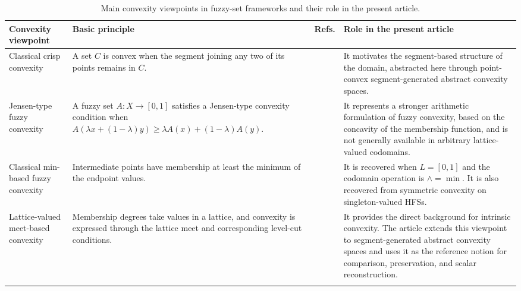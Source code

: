 \documentclass[11pt,a4paper]{article}
\begin{document}
\begin{table}[htbp]
\centering
\scriptsize
\setlength{\tabcolsep}{3pt}
\renewcommand{\arraystretch}{1.18}
\caption{Main convexity viewpoints in fuzzy-set frameworks and their role in the present article.}
\label{tablageneral}
\begin{tabularx}{\textwidth}{@{}
L{0.17\textwidth}
L{0.29\textwidth}
C{0.15\textwidth}
X
@{}}
\toprule
\textbf{Convexity viewpoint} &
\textbf{Basic principle} &
\textbf{Refs.} &
\textbf{Role in the present article} \\
\midrule

Classical crisp convexity &
A set \(C\) is convex when the segment joining any two of its points remains in \(C\). &
\citep{Klee1971} &
It motivates the segment-based structure of the domain, abstracted here through point-convex segment-generated abstract convexity spaces. \\

\addlinespace

Jensen-type fuzzy convexity &
A fuzzy set \(A:X\to[0,1]\) satisfies a Jensen-type convexity condition when
\(A(\lambda x+(1-\lambda)y)\geq \lambda A(x)+(1-\lambda)A(y)\). &
\citep{AmmarMetz1992,SyauLee2003} &
It represents a stronger arithmetic formulation of fuzzy convexity, based on the concavity of the membership function, and is not generally available in arbitrary lattice-valued codomains. \\

\addlinespace

Classical min-based fuzzy convexity &
Intermediate points have membership at least the minimum of the endpoint values. &
\citep{Zadeh1965,Lowen1980} &
It is recovered when \(L=[0,1]\) and the codomain operation is \(\wedge=\min\). It is also recovered from symmetric convexity on singleton-valued HFSs. \\

\addlinespace

Lattice-valued meet-based convexity &
Membership degrees take values in a lattice, and convexity is expressed through the lattice meet and corresponding level-cut conditions. &
\citep{Maruyama2009,JanisSeseljaTepavcevic2017} &
It provides the direct background for intrinsic convexity. The article extends this viewpoint to segment-generated abstract convexity spaces and uses it as the reference notion for comparison, preservation, and scalar reconstruction. \\

\addlinespace


\end{tabularx}
\end{table}
\end{document}
